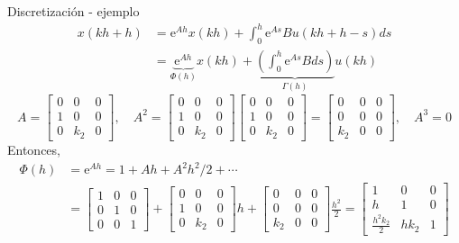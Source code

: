 \documentclass[presentation,aspectratio=1610]{beamer}
\begin{document}
\begin{frame}[label={sec:org3cae162}]{Discretización - ejemplo}
 \begin{align*}
  x(kh+h) &= \mathrm{e}^{Ah} x(kh) + \int_{0}^{h} \mathrm{e}^{As} B u(kh+h-s) ds\\
   &= \underbrace{\mathrm{e}^{Ah}}_{\Phi(h)} x(kh) + \underbrace{\left(\int_{0}^h \mathrm{e}^{As} B ds \right)}_{\Gamma(h)} u(kh)
\end{align*}
\[ A = \begin{bmatrix} 0 & 0 & 0\\1 & 0 & 0\\0 & k_2 & 0\end{bmatrix}, \quad A^2 = \begin{bmatrix} 0 & 0 & 0\\1 & 0 & 0\\0 & k_2 & 0\end{bmatrix}\begin{bmatrix} 0 & 0 & 0\\1 & 0 & 0\\0 & k_2 & 0\end{bmatrix}= \begin{bmatrix} 0 & 0 & 0\\0 & 0 & 0\\k_2 & 0  & 0\end{bmatrix}, \quad A^3 = 0\]
Entonces,
\begin{align*}
 \Phi(h) &= \mathrm{e}^{Ah} = 1 + Ah + A^2 h^2/2  + \cdots \\
 &= \begin{bmatrix} 1 & 0 & 0\\0 & 1 & 0\\0 & 0 & 1\end{bmatrix} + \begin{bmatrix} 0 & 0 & 0\\1 & 0 & 0\\0 & k_2 & 0\end{bmatrix}h + \begin{bmatrix} 0 & 0 & 0\\0 & 0 & 0\\k_2 & 0 & 0\end{bmatrix}\frac{h^ 2}{2}= \begin{bmatrix} 1 & 0 & 0\\h & 1 & 0\\\frac{h^2k_2}{2} & hk_2 & 1\end{bmatrix}
 \end{align*}
\end{frame}
\end{document}
